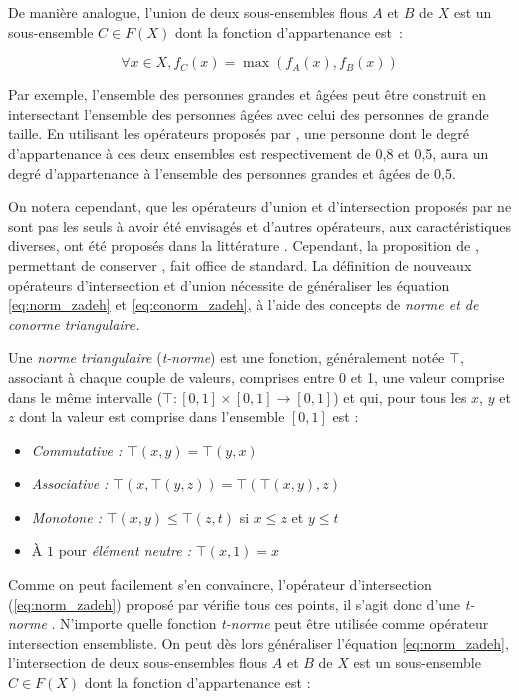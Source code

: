 De manière analogue, l’union de deux sous-ensembles flous $A$ et $B$
de $X$ est un sous-ensemble $C ∈ F(X)$ dont la fonction d’appartenance
est :

\begin{equation}
  \label{eq:conorm_zadeh}
  ∀x ∈ X, f_C (x) = \max(f_A(x), f_B(x))
\end{equation}

Par exemple, l’ensemble des personnes grandes et âgées peut être
construit en intersectant l’ensemble des personnes âgées avec celui
des personnes de grande taille. En utilisant les opérateurs proposés
par \textcite{Zadeh1965}, une personne dont le degré d’appartenance à
ces deux ensembles est respectivement de 0,8 et 0,5, aura un degré
d’appartenance à l’ensemble des personnes grandes et âgées de 0,5.

On notera cependant, que les opérateurs d’union et d’intersection
proposés par \textcite{Zadeh1965} ne sont pas les seuls à avoir été
envisagés et d’autres opérateurs, aux caractéristiques diverses, ont
été proposés dans la littérature
\autocite{Klir1995,Bouchon-Meunier1995}. Cependant, la proposition de
\textcite{Zadeh1965}, permettant de conserver
, fait office de standard. La
définition de nouveaux opérateurs d'intersection et d'union nécessite
de généraliser les équation \ref{eq:norm_zadeh} et
\ref{eq:conorm_zadeh}, à l'aide des concepts de \emph{norme \emph{et
    de} conorme triangulaire.}

Une \emph{norme triangulaire} (\emph{t-norme}) est une fonction,
généralement notée $\top$, associant à chaque couple de valeurs,
comprises entre 0 et 1, une valeur comprise dans le même intervalle
(\ie $\top : [0,1] × [0,1] \rightarrow [0,1]$) et qui, pour tous les
$x$, $y$ et $z$ dont la valeur est comprise dans l'ensemble $[0,1]$
est :

\begin{itemize}
\item \emph{Commutative :} \(⊤(x,y) = ⊤(y,x)\)
\item \emph{Associative :} \(⊤(x,⊤(y,z)) = ⊤(⊤(x,y),z)\)
\item \emph{Monotone :} \(⊤(x,y) ≤ ⊤(z,t)\) si \(x ≤ z\) et \(y ≤ t\)
\item À \(1\) pour \emph{élément neutre :} \(⊤(x,1) = x\)
\end{itemize}

Comme on peut facilement s'en convaincre, l'opérateur d'intersection
(\autoref{eq:norm_zadeh}) proposé par \textcite{Zadeh1965} vérifie
tous ces points, il s'agit donc d'une \emph{t-norme}
\autocite{Bouchon-Meunier2007}. N'importe quelle fonction
\emph{t-norme} peut être utilisée comme opérateur intersection
ensembliste. On peut dès lors généraliser l'équation
\ref{eq:norm_zadeh}, l'intersection de deux sous-ensembles flous \(A\)
et \(B\) de \(X\) est un sous-ensemble \(C ∈ F(X)\) dont la fonction
d’appartenance est :

